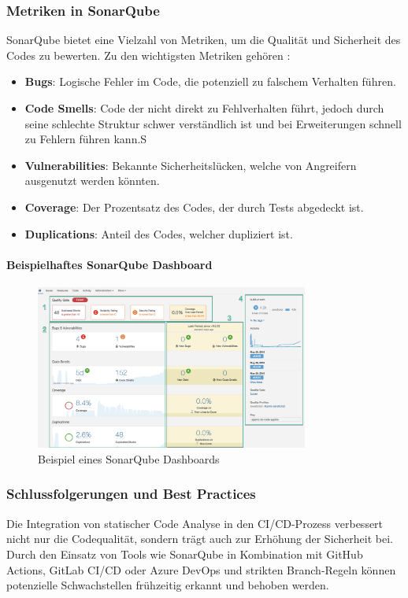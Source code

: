 \subsubsection{Metriken in SonarQube}

SonarQube bietet eine Vielzahl von Metriken, um die Qualität und Sicherheit des Codes zu bewerten. Zu den wichtigsten Metriken gehören \cite{SonarSource2021b}:

\begin{itemize}
    \item \textbf{Bugs}: Logische Fehler im Code, die potenziell zu falschem Verhalten führen.
    \item \textbf{Code Smells}: Code der nicht direkt zu Fehlverhalten führt, jedoch durch seine schlechte Struktur schwer verständlich ist und bei Erweiterungen schnell zu Fehlern führen kann.S
    \item \textbf{Vulnerabilities}: Bekannte Sicherheitslücken, welche von Angreifern ausgenutzt werden könnten.
    \item \textbf{Coverage}: Der Prozentsatz des Codes, der durch Tests abgedeckt ist.
    \item \textbf{Duplications}: Anteil des Codes, welcher dupliziert ist.
\end{itemize}

\paragraph{Beispielhaftes SonarQube Dashboard}

\begin{figure}[h!]
\centering
\includegraphics[width=0.8\textwidth]{img/sonarqube_dashboard.png}
\caption{Beispiel eines SonarQube Dashboards}
\label{fig:sonarqube_dashboard}
\end{figure}

\subsubsection{Schlussfolgerungen und Best Practices}

Die Integration von statischer Code Analyse in den CI/CD-Prozess verbessert nicht nur die Codequalität, sondern trägt auch zur Erhöhung der Sicherheit bei. Durch den Einsatz von Tools wie SonarQube in Kombination mit GitHub Actions, GitLab CI/CD oder Azure DevOps und strikten Branch-Regeln können potenzielle Schwachstellen frühzeitig erkannt und behoben werden.
